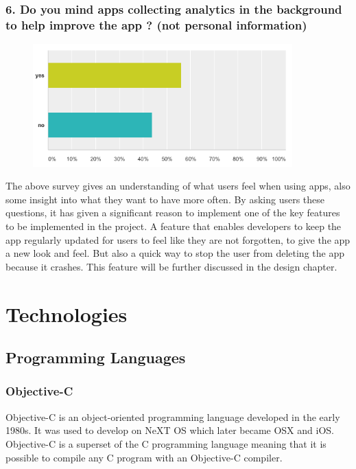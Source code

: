 \subsubsection{6. Do you mind apps collecting analytics in the background to help improve the app ? (not personal information)}

\begin{figure}[!h]
    \centering
    \includegraphics[width=100mm]{images/survey/analytics}
    \label{fig:label}
\end{figure}


The above survey gives an understanding of what users feel when using apps, also some insight into what they want to have more often. By asking users these questions, it has given a significant reason to implement one of the key features to be implemented in the project. A feature that enables developers to keep the app regularly updated for users to feel like they are not forgotten, to give the app a new look and feel. But also a quick way to stop the user from deleting the app because it crashes. This feature will be further discussed in the design chapter.



\section{Technologies}

\subsection{Programming Languages}

\subsubsection{Objective-C}
Objective-C \cite{objectiveC}  is an object-oriented programming language developed in the early 1980s. It was used to develop on NeXT OS which later became OSX and iOS. Objective-C is a superset of the C programming language meaning that it is possible to compile any C program with an Objective-C compiler. 

